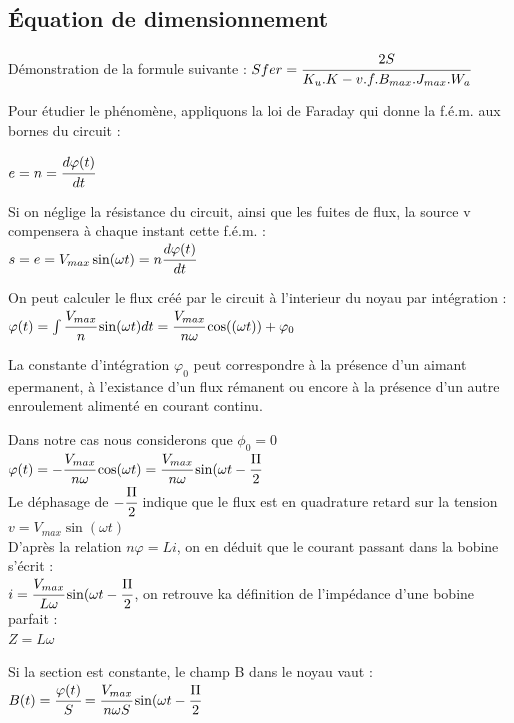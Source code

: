 	

\subsection{Équation de dimensionnement}

Démonstration de la formule suivante : $ Sfer = \cfrac{2S}{K_u.K-v.f.B_{max}.J_{max}.W_a}$


Pour étudier le phénomène, appliquons la loi de Faraday qui donne la f.é.m. aux bornes du circuit : 

$e = n= \cfrac{d\varphi(t)}{dt}$

Si on néglige la résistance du circuit, ainsi que les fuites de flux, la source v compensera à chaque instant cette f.é.m. : \\
$s = e = V_{max}\sin(\omega{}t) = n\cfrac{d\varphi(t)}{dt}$


On peut calculer le flux créé par le circuit à l'interieur du noyau par intégration : \\
$\varphi(t) = \int {\cfrac{V_{max}}{n} \sin(\omega{}t) dt} = \cfrac{V_{max}}{n\omega}\cos((\omega{}t)) + \varphi_0$

La constante d'intégration $\varphi_0$ peut correspondre à la présence d'un aimant epermanent, à l'existance d'un flux rémanent ou encore à la présence d'un autre enroulement alimenté en courant continu. 

Dans notre cas nous considerons que $\phi_0 = 0$\\

$\varphi(t) = - \cfrac{V_{max}}{n\omega} \cos(\omega{}t) = \cfrac{V_{max}}{n\omega} \sin(\omega{}t - \cfrac{\Pi}{2}$\\


Le déphasage de $- \cfrac{\Pi}{2}$ indique que le flux est en quadrature retard sur la tension $v =  V_{max}\sin(\omega{}t)$\\

D'après la relation $n\varphi = Li$, on en déduit que le courant passant dans la bobine s'écrit : \\

$i = \cfrac{V_{max}}{L\omega} \sin(\omega{}t - \cfrac{\Pi}{2}$, on retrouve ka définition de l'impédance d'une bobine parfait :\\

$Z = L\omega$


Si la section est constante, le champ B dans le noyau vaut : \\

$B(t) =  \cfrac{\varphi(t)}{S} = \cfrac{V_{max}}{n\omega S}\sin(\omega{}t - \cfrac{\Pi}{2}$\\


